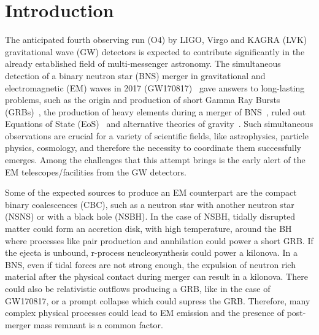 \section{Introduction}

The anticipated fourth observing run (O4) by LIGO, Virgo and KAGRA (LVK)
gravitational wave (GW) detectors is expected to contribute significantly in
the already established field of multi-messenger astronomy. The simultaneous
detection of a binary neutron star (BNS) merger in gravitational and
electromagnetic (EM) waves in 2017 (GW170817)~\cite{LIGOScientific:2017ync}
gave answers to long-lasting problems, such as the origin and production of
short Gamma Ray Bursts (GRBs)~\cite{LIGOScientific:2017ync}, the production of heavy 
elements during a merger of 
BNS~\cite{Arcavi:2017xiz,Chornock:2017sdf,2017Sci...358.1570D,2017Natur.551...80K}, 
ruled out Equations of State (EoS)~\cite{LIGOScientific:2018cki} and alternative theories of 
gravity~\cite{PhysRevLett.119.251301}. Such simultaneous observations are 
crucial for a variety of scientific fields, like astrophysics, particle 
physics, cosmology, and therefore the necessity to coordinate them successfully 
emerges. Among the challenges that this attempt brings is the early alert of the 
EM telescopes/facilities from the GW detectors.

Some of the expected sources to produce an EM counterpart are the compact 
binary coalescences (CBC), such as a neutron star with another neutron star 
(NSNS) or with a black hole (NSBH). In the case of NSBH, tidally disrupted 
matter could form an accretion disk, with high temperature, around the BH 
where processes like pair production and annhilation could power a short GRB. 
If the ejecta is unbound, r-process neucleosynthesis could power a kilonova. 
In a BNS, even if tidal forces are not strong enough, the expulsion of neutron 
rich material after the physical contact during merger can result in a kilonova. 
There could also be relativistic outflows producing a GRB, like in the case of 
GW170817, or a prompt collapse which could supress the GRB. Therefore, many 
complex physical processes could lead to EM emission and the presence of 
post-merger mass remnant is a common factor.

